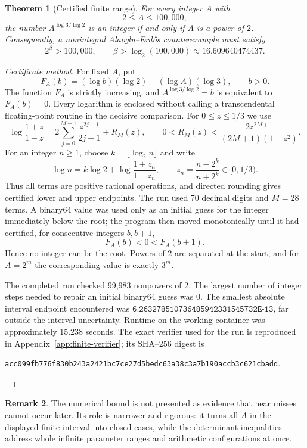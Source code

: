 \documentclass[11pt]{article}
\newtheorem{theorem}{Theorem}[section]
\theoremstyle{definition}
\newtheorem{remark}[theorem]{Remark}
\begin{document}
\begin{theorem}[Certified finite range]
\label{thm:finite-range}
For every integer $A$ with
\[
  2\le A\le 100,000,
\]
the number $A^{\log 3/\log 2}$ is an integer if and only if $A$ is a power
of $2$.  Consequently, a nonintegral Alaoglu--Erd\H{o}s counterexample must
satisfy
\[
  2^\beta>100,000,
  \qquad
  \beta>\log_2(100,000)\approx 16.609640474437.
\]
\end{theorem}

\begin{proof}[Certificate method]
For fixed $A$, put
\[
  F_A(b)=(\log b)(\log 2)-(\log A)(\log 3),\qquad b>0.
\]
The function $F_A$ is strictly increasing, and
$A^{\log 3/\log 2}=b$ is equivalent to $F_A(b)=0$.
Every logarithm is enclosed without calling a transcendental floating-point
routine in the decisive comparison.  For $0\le z\le 1/3$ we use
\[
  \log\frac{1+z}{1-z}
  =2\sum_{j=0}^{M-1}\frac{z^{2j+1}}{2j+1}+R_M(z),
  \qquad
  0<R_M(z)<
  \frac{2z^{2M+1}}{(2M+1)(1-z^2)}.
\]
For an integer $n\ge1$, choose $k=\lfloor\log_2 n\rfloor$ and write
\[
  \log n=k\log2+
  \log\frac{1+z_n}{1-z_n},
  \qquad
  z_n=\frac{n-2^k}{n+2^k}\in[0,1/3).
\]
Thus all terms are positive rational operations, and directed rounding gives
certified lower and upper endpoints.  The run used 70 decimal digits and
$M=28$ terms.  A binary64 value was used only as an initial guess for the
integer immediately below the root; the program then moved monotonically
until it had certified, for consecutive integers $b,b+1$,
\[
  F_A(b)<0<F_A(b+1).
\]
Hence no integer can be the root.  Powers of $2$ are separated at the start,
and for $A=2^m$ the corresponding value is exactly $3^m$.

The completed run checked 99,983 nonpowers of $2$.  The largest number of
integer steps needed to repair an initial binary64 guess was 0.  The
smallest absolute interval endpoint encountered was
$\texttt{6.263278510736485942331545732E-13}$, far outside the interval uncertainty.  Runtime on the
working container was approximately 15.238 seconds.  The exact verifier
used for the run is reproduced in Appendix~\ref{app:finite-verifier}; its
SHA--256 digest is
\begin{center}
\texttt{acc099fb776f830b243a2421bc7ce27d5bedc63a38c3a7b190accb3c621cbadd}.
\end{center}
\end{proof}

\begin{remark}
The numerical bound is not presented as evidence that near misses cannot occur
later.  Its role is narrower and rigorous: it turns all $A$ in the displayed
finite interval into closed cases, while the determinant inequalities address
whole infinite parameter ranges and arithmetic configurations at once.
\end{remark}
\end{document}
